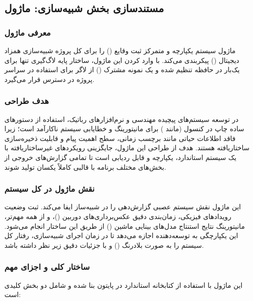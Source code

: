 \documentclass{article}
\begin{document}
\subsection{مستندسازی بخش شبیه‌سازی: ماژول }

\subsubsection{معرفی ماژول}
ماژول  سیستم یکپارچه و متمرکز ثبت وقایع () را برای کل پروژه شبیه‌سازی همزاد دیجیتال () پیکربندی می‌کند. با وارد کردن این ماژول، ساختار پایه لاگ‌گیری تنها برای یک‌بار در حافظه تنظیم شده و یک نمونه مشترک () از لاگر برای استفاده در سراسر پروژه در دسترس قرار می‌گیرد.

\subsubsection{هدف طراحی}
در توسعه سیستم‌های پیچیده مهندسی و نرم‌افزارهای رباتیک، استفاده از دستورهای ساده چاپ در کنسول (مانند ) برای مانیتورینگ و خطایابی سیستم ناکارآمد است؛ زیرا فاقد اطلاعات حیاتی مانند برچسب زمانی، سطح اهمیت پیام و قابلیت ذخیره‌سازی ساختاریافته هستند. هدف از طراحی این ماژول، جایگزینی رویکردهای غیرساختاریافته با یک سیستم استاندارد، یکپارچه و قابل ردیابی است تا تمامی گزارش‌های خروجی از بخش‌های مختلف برنامه با قالبی کاملاً یکسان تولید شوند.

\subsubsection{نقش ماژول در کل سیستم}
این ماژول نقش سیستم عصبی گزارش‌دهی را در شبیه‌ساز ایفا می‌کند. ثبت وضعیت رویدادهای فیزیکی، زمان‌بندی دقیق عکس‌برداری‌های دوربین ()، و از همه مهم‌تر، مانیتورینگ نتایج استنتاج مدل‌های بینایی ماشین () از طریق این ساختار انجام می‌شود. این یکپارچگی به توسعه‌دهنده اجازه می‌دهد تا در زمان اجرای شبیه‌سازی، رفتار کل سیستم را به صورت بلادرنگ () و با جزئیات دقیق زیر نظر داشته باشد.

\subsubsection{ساختار کلی و اجزای مهم}
این ماژول با استفاده از کتابخانه استاندارد  در پایتون بنا شده و شامل دو بخش کلیدی است:
\end{document}
